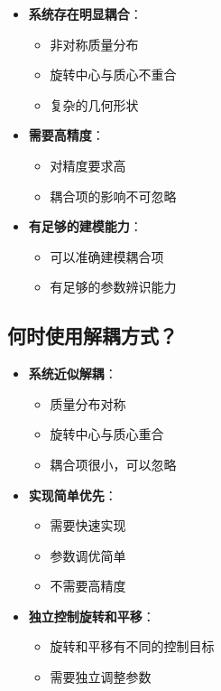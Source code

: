 \documentclass[12pt,a4paper]{article}
\begin{document}
\begin{itemize}
\item \textbf{系统存在明显耦合}：
\begin{itemize}
\item 非对称质量分布
\item 旋转中心与质心不重合
\item 复杂的几何形状
\end{itemize}

\item \textbf{需要高精度}：
\begin{itemize}
\item 对精度要求高
\item 耦合项的影响不可忽略
\end{itemize}

\item \textbf{有足够的建模能力}：
\begin{itemize}
\item 可以准确建模耦合项
\item 有足够的参数辨识能力
\end{itemize}
\end{itemize}

\subsection{何时使用解耦方式？}

\begin{itemize}
\item \textbf{系统近似解耦}：
\begin{itemize}
\item 质量分布对称
\item 旋转中心与质心重合
\item 耦合项很小，可以忽略
\end{itemize}

\item \textbf{实现简单优先}：
\begin{itemize}
\item 需要快速实现
\item 参数调优简单
\item 不需要高精度
\end{itemize}

\item \textbf{独立控制旋转和平移}：
\begin{itemize}
\item 旋转和平移有不同的控制目标
\item 需要独立调整参数
\end{itemize}
\end{itemize}
\end{document}
